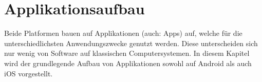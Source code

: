 \section{Applikationsaufbau}
	Beide Platformen bauen auf Applikationen (auch: Apps) auf, welche für die
	unterschiedlichsten Anwendungszwecke genutzt werden. Diese unterscheiden sich
	nur wenig von Software auf klassischen Computersystemen. In diesem
	Kapitel wird der grundlegende Aufbau von Applikationen sowohl auf Android als
	auch iOS vorgestellt.
